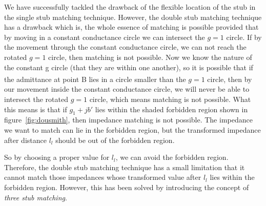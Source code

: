We have successfully tackled the drawback of the flexible location of the stub in the single stub matching technique. However, the double stub matching technique has a drawback which is, the whole essence of matching is possible provided that by moving in a constant conductance circle we can intersect the $g = 1$ circle. If by the movement through the constant conductance circle, we can not reach the rotated $g = 1$ circle, then matching is not possible. Now we know the nature of the constant g circle (that they are within one another), so it is possible that if the admittance at point B\textsuperscript{\textemdash} lies in a circle smaller than the $g = 1$ circle, then by our movement inside the constant conductance circle, we will never be able to intersect the rotated $g = 1$ circle, which means matching is not possible. What this means is that if $g_1 + jb'$ lies within the shaded forbidden region shown in figure~\ref{fig:dousmith}, then impedance matching is not possible. The impedance we want to match can lie in the forbidden region, but the transformed impedance after distance $ l_l$ should be out of the forbidden region.

So by choosing a proper value for $l_l$, we can avoid the forbidden region. Therefore, the double stub matching technique has a small limitation that it cannot match those impedances whose transformed value after $l_l$ lies within the forbidden region. However, this has been solved by introducing the concept of \emph{three stub matching}.

